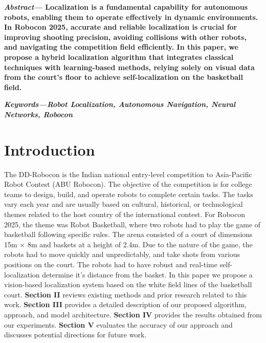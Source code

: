 \documentclass[a4paper]{article}
\begin{document}
\begin{multicols}{2}
\setlength{\columnsep}{0.5cm}

\noindent \textbf{\textit{Abstract---}
Localization is a fundamental capability for autonomous robots, enabling them 
to operate effectively in dynamic environments. In Robocon 2025, accurate and 
reliable localization is crucial for improving shooting precision, avoiding 
collisions with other robots, and navigating the competition field efficiently. 
In this paper, we propose a hybrid localization algorithm that integrates classical 
techniques with learning-based methods, relying solely on visual data from the court’s
floor to achieve self-localization on the basketball field.
}

\small	
\noindent \textbf{
  \textit{Keywords---}\textit{Robot Localization, Autonomous Navigation, Neural Networks, Robocon}}

\section{Introduction}
\par \noindent
The DD-Robocon is the Indian national entry-level competition to Asia-Pacific Robot Contest (ABU Robocon). The objective of the competition is for college teams to design, build, and operate robots to complete certain tasks. The tasks vary each year and are usually based on cultural, historical, or technological themes related to the host country of the international contest. For Robocon 2025, the theme was Robot Basketball, where two robots had to play the game of basketball following specific rules. The arena consisted of a court of dimensions 15m $\times$ 8m and baskets at a height of 2.4m. Due to the nature of the game, the robots had to move quickly and unpredictably, and take shots from various positions on the court. The robots had to have robust and real-time self-localization determine it's distance from the basket.
In this paper we propose a vision-based localization system based on the white field lines of the basketball court.
\textbf{Section II} reviews existing methods and prior research related to this work. 
\textbf{Section III} provides a detailed description of our proposed algorithm, approach, and model architecture. 
\textbf{Section IV} provides the results obtained from our experiments. 
\textbf{Section V} evaluates the accuracy of our approach and discusses potential directions for future work.



\end{multicols}
\end{document}
